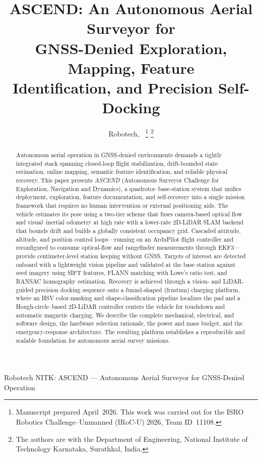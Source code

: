 \documentclass[journal]{IEEEtran}
\begin{document}
\title{ASCEND: An Autonomous Aerial Surveyor for\\
GNSS-Denied Exploration, Mapping, Feature\\
Identification, and Precision Self-Docking}

\author{Robotech,~%
\thanks{Manuscript prepared April~2026. This work was carried out for the
ISRO Robotics Challenge--Unmanned (IRoC-U) 2026, Team ID~11108.}%
\thanks{The authors are with the Department of Engineering,
National Institute of Technology Karnataka, Surathkal, India.}}

%
{Robotech NITK: ASCEND --- Autonomous Aerial Surveyor for GNSS-Denied Operation}

\maketitle

\begin{abstract}
Autonomous aerial operation in GNSS-denied environments demands a tightly
integrated stack spanning closed-loop flight stabilization, drift-bounded
state estimation, online mapping, semantic feature identification, and
reliable physical recovery. This paper presents \emph{ASCEND}
(Autonomous Surveyor Challenge for Exploration, Navigation and Dynamics),
a quadrotor--base-station system that unifies deployment, exploration,
feature documentation, and self-recovery into a single mission framework
that requires no human intervention or external positioning aids.
The vehicle estimates its pose using a two-tier scheme that fuses
camera-based optical flow and visual--inertial odometry at high rate with
a lower-rate 2D-LiDAR SLAM backend that bounds drift and builds a globally
consistent occupancy grid. Cascaded attitude, altitude, and position
control loops---running on an ArduPilot flight controller and reconfigured
to consume optical-flow and rangefinder measurements through EKF3---provide
centimeter-level station keeping without GNSS. Targets of interest are
detected onboard with a lightweight vision pipeline and validated at the
base station against seed imagery using SIFT features, FLANN matching with
Lowe's ratio test, and RANSAC homography estimation. Recovery is achieved
through a vision- and LiDAR-guided precision docking sequence onto a
funnel-shaped (frustum) charging platform, where an HSV color-masking and
shape-classification pipeline localizes the pad and a Hough-circle--based
2D-LiDAR controller centers the vehicle for touchdown and automatic
magnetic charging. We describe the complete mechanical, electrical, and
software design, the hardware selection rationale, the power and mass
budget, and the emergency-response architecture. The resulting platform
establishes a reproducible and scalable foundation for autonomous aerial
survey missions.
\end{abstract}
\end{document}
